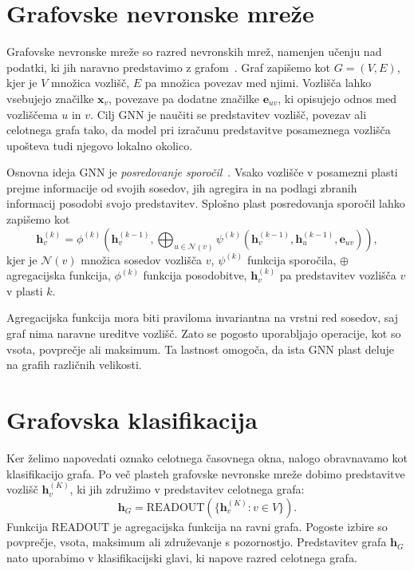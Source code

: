 \section{Grafovske nevronske mreže}
\label{subsec:gnn}

Grafovske nevronske mreže so razred nevronskih mrež, namenjen učenju nad podatki, ki jih naravno predstavimo z grafom~\cite{ref_gnn}.
Graf zapišemo kot $G = (V, E)$, kjer je $V$ množica vozlišč, $E$ pa množica povezav med njimi.
Vozlišča lahko vsebujejo značilke $\mathbf{x}_v$, povezave pa dodatne značilke $\mathbf{e}_{uv}$, ki opisujejo odnos med vozliščema $u$ in $v$.
Cilj GNN je naučiti se predstavitev vozlišč, povezav ali celotnega grafa tako, da model pri izračunu predstavitve posameznega vozlišča upošteva tudi njegovo lokalno okolico.

Osnovna ideja GNN je \emph{posredovanje sporočil}~\cite{gilmer2017neural}.
Vsako vozlišče v posamezni plasti prejme informacije od svojih sosedov, jih agregira in na podlagi zbranih informacij posodobi svojo predstavitev.
Splošno plast posredovanja sporočil lahko zapišemo kot
\begin{equation}
    \mathbf{h}_v^{(k)} =
    \phi^{(k)}
    \left(
        \mathbf{h}_v^{(k-1)},
        \bigoplus_{u \in \mathcal{N}(v)}
        \psi^{(k)}
        \left(
            \mathbf{h}_v^{(k-1)},
            \mathbf{h}_u^{(k-1)},
            \mathbf{e}_{uv}
        \right)
    \right),
\end{equation}
kjer je $\mathcal{N}(v)$ množica sosedov vozlišča $v$, $\psi^{(k)}$ funkcija sporočila, $\oplus$ agregacijska funkcija, $\phi^{(k)}$ funkcija posodobitve, $\mathbf{h}_v^{(k)}$ pa predstavitev vozlišča $v$ v plasti $k$.

Agregacijska funkcija mora biti praviloma invariantna na vrstni red sosedov, saj graf nima naravne ureditve vozlišč.
Zato se pogosto uporabljajo operacije, kot so vsota, povprečje ali maksimum.
Ta lastnost omogoča, da ista GNN plast deluje na grafih različnih velikosti.

\section{Grafovska klasifikacija}
\label{subsec:grafovska-klasifikacija}

Ker želimo napovedati oznako celotnega časovnega okna, nalogo obravnavamo kot klasifikacijo grafa.
Po več plasteh grafovske nevronske mreže dobimo predstavitve vozlišč $\mathbf{h}_v^{(K)}$, ki jih združimo v predstavitev celotnega grafa:
\begin{equation}
    \mathbf{h}_G =
    \text{READOUT}
    \left(
        \{\mathbf{h}_v^{(K)} : v \in V\}
    \right).
\end{equation}
Funkcija $\text{READOUT}$ je agregacijska funkcija na ravni grafa.
Pogoste izbire so povprečje, vsota, maksimum ali združevanje s pozornostjo.
Predstavitev grafa $\mathbf{h}_G$ nato uporabimo v klasifikacijski glavi, ki napove razred celotnega grafa.


